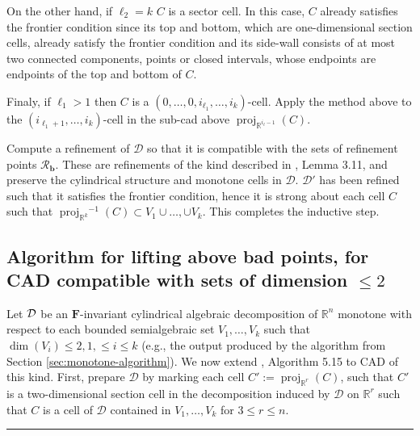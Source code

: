 \documentclass[
]{book}
\theoremstyle{definition}
\theoremstyle{definition}
\theoremstyle{definition}
\theoremstyle{definition}
\theoremstyle{remark}
\begin{document}
On the other hand, if \(\ell_2 = k\) \(C\) is a sector cell. In this case, \(C\) already satisfies the frontier condition since its top and bottom, which are one-dimensional section cells, already satisfy the frontier condition and its side-wall consists of at most two connected components, points or closed intervals, whose endpoints are endpoints of the top and bottom of \(C\).

Finaly, if \(\ell_1 > 1\) then \(C\) is a \((0,\ldots,0,i_{\ell_1},\ldots,i_k)\)-cell. Apply the method above to the \((i_{\ell_1 + 1},\ldots,i_k)\)-cell in the sub-cad above \({\operatorname{proj}_{\mathbb{R}^{i_\ell - 1}}}(C)\).

Compute a refinement of \(\mathcal{D}\) so that it is compatible with the sets of refinement points \(\mathcal{R}_\mathbf{b}\). These are refinements of the kind described in \citet{bgv15}, Lemma 3.11, and preserve the cylindrical structure and monotone cells in \(\mathcal{D}\).
\(\mathcal{D'}\) has been refined such that it satisfies the frontier condition, hence it is strong about each cell \(C\) such that \({\operatorname{proj}_{\mathbb{R}^{k}}}^{-1}(C) \subset V_1\cup \ldots, \cup V_k\). This completes the inductive step.

\hypertarget{sec:ext-lazard-algorithm}{%
\subsection{\texorpdfstring{Algorithm for lifting above bad points, for CAD compatible with sets of dimension \(\le 2\)}{Algorithm for lifting above bad points, for CAD compatible with sets of dimension \textbackslash le 2}}\label{sec:ext-lazard-algorithm}}

Let \(\cal D\) be an \(\mathbf{F}\)-invariant cylindrical algebraic decomposition of \(\mathbb{R}^n\) monotone with respect to each bounded semialgebraic set \(V_1,\ldots, V_k\) such that \(\dim(V_i) \le 2, 1,\le i \le k\) (e.g., the output produced by the algorithm from Section \ref{sec:monotone-algorithm}).
We now extend \citet{lazard10}, Algorithm 5.15 to CAD of this kind.
First, prepare \(\mathcal{D}\) by marking each cell \(C' := {\operatorname{proj}_{\mathbb{R}^{r}}}(C)\), such that \(C'\) is a two-dimensional section cell in the decomposition induced by \(\mathcal{D}\) on \(\mathbb{R}^r\) such that \(C\) is a cell of \(\mathcal{D}\) contained in \(V_1,\ldots,V_k\) for \(3 \le r \le n\).

\begin{center}\rule{0.5\linewidth}{0.5pt}\end{center}
\end{document}
